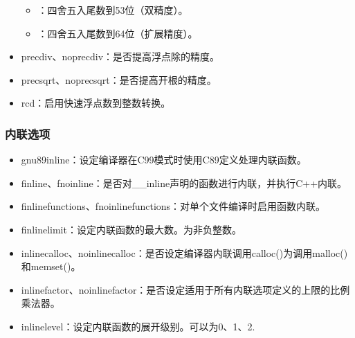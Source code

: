 \documentclass[a4paper,12pt,english]{sphinxmanual}
\begin{document}
\begin{itemize}
\begin{itemize}
\item {} 
：四舍五入尾数到53位（双精度）。

\item {} 
：四舍五入尾数到64位（扩展精度）。

\end{itemize}

\item {} 
\sphinxAtStartPar
\sphinxhyphen{}prec\sphinxhyphen{}div、\sphinxhyphen{}no\sphinxhyphen{}prec\sphinxhyphen{}div：是否提高浮点除的精度。

\item {} 
\sphinxAtStartPar
\sphinxhyphen{}prec\sphinxhyphen{}sqrt、\sphinxhyphen{}no\sphinxhyphen{}prec\sphinxhyphen{}sqrt：是否提高开根的精度。

\item {} 
\sphinxAtStartPar
\sphinxhyphen{}rcd：启用快速浮点数到整数转换。

\end{itemize}


\subsubsection{内联选项}
\label{\detokenize{compiler/intel:id8}}\begin{itemize}
\item {} 
\sphinxAtStartPar
\sphinxhyphen{}gnu89\sphinxhyphen{}inline：设定编译器在C99模式时使用C89定义处理内联函数。

\item {} 
\sphinxAtStartPar
\sphinxhyphen{}finline、\sphinxhyphen{}fno\sphinxhyphen{}inline：是否对\_\_inline声明的函数进行内联，并执行C++内联。

\item {} 
\sphinxAtStartPar
\sphinxhyphen{}finline\sphinxhyphen{}functions、\sphinxhyphen{}fno\sphinxhyphen{}inline\sphinxhyphen{}functions：对单个文件编译时启用函数内联。

\item {} 
\sphinxAtStartPar
\sphinxhyphen{}finline\sphinxhyphen{}limit：设定内联函数的最大数。为非负整数。

\item {} 
\sphinxAtStartPar
\sphinxhyphen{}inline\sphinxhyphen{}calloc、\sphinxhyphen{}no\sphinxhyphen{}inline\sphinxhyphen{}calloc：是否设定编译器内联调用calloc()为调用malloc()和memset()。

\item {} 
\sphinxAtStartPar
\sphinxhyphen{}inline\sphinxhyphen{}factor、\sphinxhyphen{}no\sphinxhyphen{}inline\sphinxhyphen{}factor：是否设定适用于所有内联选项定义的上限的比例乘法器。

\item {} 
\sphinxAtStartPar
\sphinxhyphen{}inline\sphinxhyphen{}level：设定内联函数的展开级别。可以为0、1、2.

\end{itemize}
\end{document}
